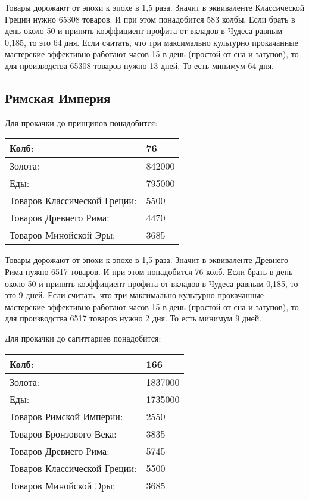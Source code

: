 Товары дорожают от эпохи к эпохе в 1,5 раза.
Значит в эквиваленте Классической Греции нужно 65308 товаров.
И при этом понадобится 583 колбы. Если брать в день около 50 и принять коэффициент профита от вкладов
в Чудеса равным 0,185, то это 64 дня.
Если считать, что три максимально культурно прокачанные мастерские эффективно работают часов 15 в день (простой от сна и затупов),
то для производства 65308 товаров нужно 13 дней.
То есть минимум 64 дня.



\subsection{Римская Империя}

Для прокачки до принципов понадобится:

\begin{center}
    \begin{tabular}[h!]{|l|l|}
        \hline
        Колб:   & 76 \\\hline
        Золота: & 842000 \\\hline
        Еды:    & 795000 \\\hline
        Товаров Классической Греции: & 5500 \\\hline
        Товаров Древнего Рима: & 4470 \\\hline
        Товаров Минойской Эры: & 3685 \\\hline
    \end{tabular}
\end{center}

Товары дорожают от эпохи к эпохе в 1,5 раза.
Значит в эквиваленте Древнего Рима нужно 6517 товаров.
И при этом понадобится 76 колб. Если брать в день около 50 и принять коэффициент профита от вкладов
в Чудеса равным 0,185, то это 9 дней.
Если считать, что три максимально культурно прокачанные мастерские эффективно работают часов 15 в день (простой от сна и затупов),
то для производства 6517 товаров нужно 2 дня.
То есть минимум 9 дней.


Для прокачки до сагиттариев понадобится:

\begin{center}
    \begin{tabular}[h!]{|l|l|}
        \hline
        Колб:   & 166 \\\hline
        Золота: & 1837000 \\\hline
        Еды:    & 1735000 \\\hline
        Товаров Римской Империи: & 2550 \\\hline
        Товаров Бронзового Века: & 3835 \\\hline
        Товаров Древнего Рима: & 5745 \\\hline
        Товаров Классической Греции: & 5500 \\\hline
        Товаров Минойской Эры: & 3685 \\\hline
    \end{tabular}
\end{center}

